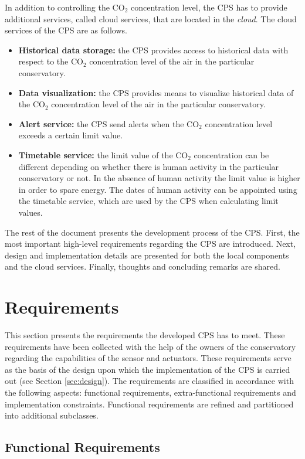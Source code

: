 \documentclass[a4paper, 11pt]{article}
\begin{document}
	In addition to controlling the CO$_2$ concentration level, the CPS has to provide additional services, called cloud services, that are located in the \emph{cloud}. The cloud services of the CPS are as follows. 
	\begin{itemize}
		\item \textbf{Historical data storage:} the CPS provides access to historical data with respect to the CO$_2$ concentration level of the air in the particular conservatory.
		\item \textbf{Data visualization:} the CPS provides means to visualize historical data of the CO$_2$ concentration level of the air in the particular conservatory.
		\item \textbf{Alert service:} the CPS send alerts when the CO$_2$ concentration level exceeds a certain limit value.
		\item \textbf{Timetable service:} the limit value of the CO$_2$ concentration can be different depending on whether there is human activity in the particular conservatory or not. In the absence of human activity the limit value is higher in order to spare energy. The dates of human activity can be appointed using the timetable service, which are used by the CPS when calculating limit values.
	\end{itemize}
	
	The rest of the document presents the development process of the CPS. First, the most important high-level requirements regarding the CPS are introduced. Next, design and implementation details are presented for both the local components and the cloud services. Finally, thoughts and concluding remarks are shared.	
	
	\section{Requirements}
	\label{sec:requirements}
	This section presents the requirements the developed CPS has to meet. These requirements have been collected with the help of the owners of the conservatory regarding the capabilities of the sensor and actuators. These requirements serve as the basis of the design upon which the implementation of the CPS is carried out (see Section \ref{sec:design}). The requirements are classified in accordance with the following aspects: functional requirements, extra-functional requirements and implementation constraints. Functional requirements are refined and partitioned into additional subclasses.
	
	\subsection{Functional Requirements}
	
\end{document}
